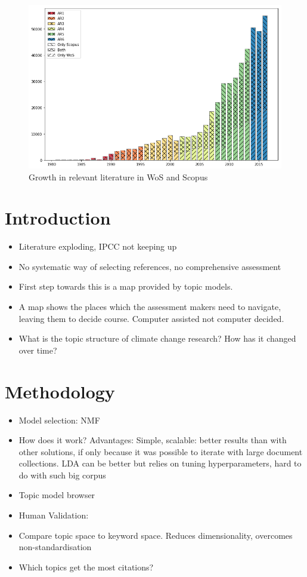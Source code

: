 \documentclass{article}
\begin{document}
\begin{figure}
	\includegraphics[width=\linewidth]{plots/wos_scopus_docs_time}
    \caption{Growth in relevant literature in WoS and Scopus}
    \label{growth}
\end{figure}




\section{Introduction}
\begin{itemize}
	\item Literature exploding, IPCC not keeping up \citep{minx2016learning}
    \item No systematic way of selecting references, no comprehensive assessment
    \item First step towards this is a map provided by topic models. 
    \item A map shows the places which the assessment makers need to navigate, leaving them to decide course. Computer assisted not computer decided.
    \item What is the topic structure of climate change research? How has it changed over time?
\end{itemize}

\section{Methodology}

\begin{itemize}
\item Model selection: NMF \citep{Lee1999}
\item How does it work? Advantages: Simple, scalable: better results than with other solutions, if only because it was possible to iterate with large document collections. LDA can be better but relies on tuning hyperparameters, hard to do with such big corpus
\item Topic model browser \citet{Chaney2012}
\item Human Validation: 
\item Compare topic space to keyword space. Reduces dimensionality, overcomes non-standardisation
\item Which topics get the most citations?

\end{itemize}
\end{document}
